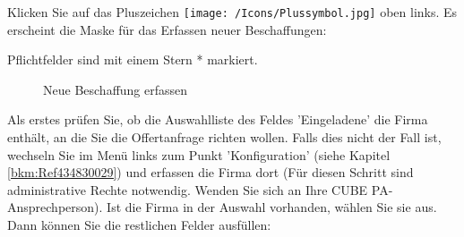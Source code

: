
Klicken Sie auf das Pluszeichen \texttt{[image: /Icons/Plussymbol.jpg]}  oben links. Es erscheint die Maske für das Erfassen neuer Beschaffungen:

\vspace{\baselineskip}

Pflichtfelder sind mit einem Stern * markiert.

\begin{figure}[H]
\caption{Neue Beschaffung erfassen}
\end{figure}

Als erstes prüfen Sie, ob die Auswahlliste des Feldes 'Eingeladene'  die Firma enthält, an die Sie die Offertanfrage richten wollen. Falls dies nicht der Fall ist, wechseln Sie im Menü links zum Punkt 'Konfiguration' (siehe Kapitel \ref{bkm:Ref434830029}) und erfassen die Firma dort (Für diesen Schritt sind administrative Rechte notwendig. Wenden Sie sich an Ihre CUBE PA-Ansprechperson). Ist die Firma in der Auswahl vorhanden, wählen Sie sie aus. Dann können Sie die restlichen Felder ausfüllen:

\vspace{\baselineskip}

